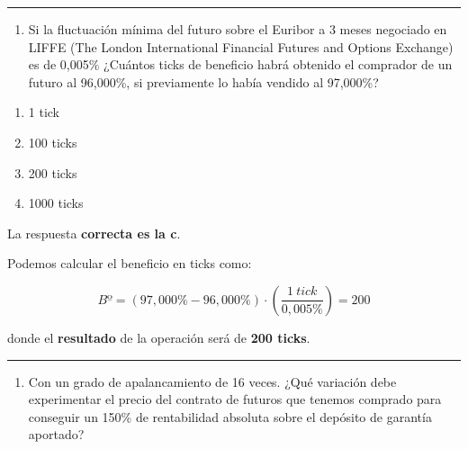\documentclass[
  letterpaper,
  DIV=11,
  numbers=noendperiod]{scrreprt}
\providecommand{\tightlist}{%
  \setlength{\itemsep}{0pt}\setlength{\parskip}{0pt}}\usepackage{longtable,booktabs,array}
\begin{document}
\begin{center}\rule{0.5\linewidth}{0.5pt}\end{center}

\begin{enumerate}
\def\labelenumi{\arabic{enumi}.}
\setcounter{enumi}{66}
\tightlist
\item
  Si la fluctuación mínima del futuro sobre el Euribor a 3 meses
  negociado en LIFFE (The London International Financial Futures and
  Options Exchange) es de 0,005\% ¿Cuántos ticks de beneficio habrá
  obtenido el comprador de un futuro al 96,000\%, si previamente lo
  había vendido al 97,000\%?
\end{enumerate}

\begin{enumerate}
\def\labelenumi{\alph{enumi})}
\item
  1 tick
\item
  100 ticks
\item
  200 ticks
\item
  1000 ticks
\end{enumerate}

\begin{tcolorbox}[enhanced jigsaw, left=2mm, opacityback=0, colback=white, breakable, arc=.35mm, bottomrule=.15mm, rightrule=.15mm, toprule=.15mm, leftrule=.75mm, colframe=quarto-callout-tip-color-frame]
\begin{minipage}[t]{5.5mm}
\textcolor{quarto-callout-tip-color}{\faLightbulb}
\end{minipage}%
\begin{minipage}[t]{\textwidth - 5.5mm}

La respuesta \textbf{correcta es la c}.

Podemos calcular el beneficio en ticks como:

\[Bº =( 97,000\% - 96,000\% ) \cdot \left(\frac{ 1\ tick}{0,005\%} \right) = 200\]

donde el \textbf{resultado} de la operación será de \textbf{200 ticks}.

\end{minipage}%
\end{tcolorbox}

\begin{center}\rule{0.5\linewidth}{0.5pt}\end{center}

\begin{enumerate}
\def\labelenumi{\arabic{enumi}.}
\setcounter{enumi}{67}
\tightlist
\item
  Con un grado de apalancamiento de 16 veces. ¿Qué variación debe
  experimentar el precio del contrato de futuros que tenemos comprado
  para conseguir un 150\% de rentabilidad absoluta sobre el depósito de
  garantía aportado?
\end{enumerate}
\end{document}
